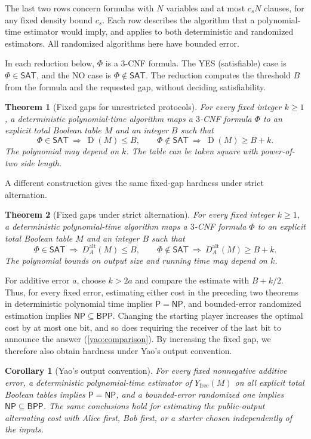 \documentclass[11pt,letterpaper]{article} \usepackage[utf8]{inputenc}
\theoremstyle{plain} \newtheorem{theorem}{Theorem}[section]
\newtheorem{corollary}[corollary]{Corollary} \aliascntresetthe{corollary}
\theoremstyle{definition} \newaliascnt{definition}{theorem}
\newcommand{\D}{\operatorname{D}}
\newcommand{\NP}{\mathsf{NP}}
\newcommand{\BPP}{\mathsf{BPP}}
\newcommand{\SAT}{\mathsf{SAT}}
\begin{document}
The last two rows concern formulas with $N$ variables and at most $c_sN$
clauses, for any fixed density bound $c_s$. Each row describes the algorithm
that a polynomial-time estimator would imply, and applies to both deterministic and randomized estimators. All randomized algorithms here have bounded error. 

In each reduction below,
$\Phi$ is a $3$-CNF formula. The YES (satisfiable) case is $\Phi\in\SAT$,
and the NO case is $\Phi\notin\SAT$. The reduction computes the threshold
$B$ from the formula and the requested gap, without deciding
satisfiability.

\begin{theorem}[Fixed gaps for unrestricted protocols]
\label{intro:deterministic}
For every fixed integer $k\ge1$, a deterministic polynomial-time algorithm
maps a $3$-CNF formula $\Phi$ to an explicit total Boolean table $M$ and an
integer $B$ such that
\[
\Phi\in\SAT\ \Longrightarrow\ \D(M)\le B,\qquad
\Phi\notin\SAT\ \Longrightarrow\ \D(M)\ge B+k.
\]
The polynomial may depend on $k$. The table can be taken square with
power-of-two side length.
\end{theorem}

A different construction gives the same fixed-gap hardness under
strict alternation.

\begin{theorem}[Fixed gaps under strict alternation]
\label{yao:main}
For every fixed integer $k\ge1$, a deterministic polynomial-time algorithm
maps a $3$-CNF formula $\Phi$ to an explicit total Boolean table $M$ and an
integer $B$ such that
\[
\Phi\in\SAT\ \Longrightarrow\ D_A^{\mathrm{alt}}(M)\le B,\qquad
\Phi\notin\SAT\ \Longrightarrow\ D_A^{\mathrm{alt}}(M)\ge B+k.
\]
The polynomial bounds on output size and running time may depend on $k$.
\end{theorem}

For additive error $a$, choose $k>2a$ and compare the estimate with
$B+k/2$. Thus, for every fixed error, estimating
either cost in the preceding two theorems in deterministic polynomial time
implies $\mathsf P=\NP$, and bounded-error randomized estimation implies
$\NP\subseteq\BPP$. Changing the starting player increases the optimal cost by at most one
bit, and so does requiring the receiver of the last bit to announce the
answer (\cref{yao:comparison}). By increasing the fixed
gap, we therefore also obtain hardness under Yao's output convention.

\begin{corollary}[Yao's output convention]\label{yao:bpp}
For every fixed nonnegative additive error, a deterministic polynomial-time
estimator of $Y_{\mathrm{free}}(M)$ on all explicit total Boolean tables
implies $\mathsf P=\NP$, and a bounded-error randomized one implies
$\NP\subseteq\BPP$. The same conclusions hold for estimating the public-output
alternating cost with Alice first, Bob first, or a starter chosen
independently of the inputs.
\end{corollary}
\end{document}
